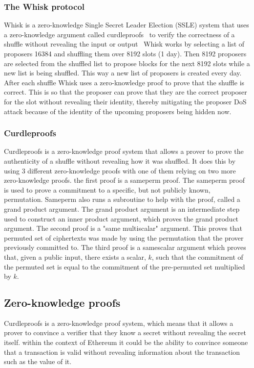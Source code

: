 \subsubsection{The Whisk protocol}\label{sec:background-mitigation}
Whisk is a zero-knowledge Single Secret Leader Election (SSLE) system that uses a zero-knowledge argument called curdleproofs~\cite{Curdleproofs} to verify the correctness of a shuffle without revealing the input or output~\cite{10.1145/3419614.3423258}
Whisk works by selecting a list of proposers 16384 and shuffling them over 8192 slots (1 day).
Then 8192 proposers are selected from the shuffled list to propose blocks for the next 8192 slots while a new list is being shuffled.
This way a new list of proposers is created every day.
After each shuffle Whisk uses a zero-knowledge proof to prove that the shuffle is correct.
This is so that the proposer can prove that they are the correct proposer for the slot without revealing their identity, thereby mitigating the proposer DoS attack because of the identity of the upcoming proposers being hidden now.

\subsubsection{Curdleproofs}\label{sec:background-curdleproofs}
Curdleproofs is a zero-knowledge proof system that allows a prover to prove the authenticity of a shuffle without revealing how it was shuffled.
It does this by using 3 different zero-knowledge proofs with one of them relying on two more zero-knowledge proofs.
the first proof is a sameperm proof.
The sameperm proof is used to prove a commitment to a specific, but not publicly known, permutation.
Sameperm also runs a subroutine to help with the proof, called a grand product argument.
The grand product argument is an intermediate step used to construct an inner product argument, which proves the grand product argument.
The second proof is a "same multiscalar" argument.
This proves that permuted set of ciphertexts was made by using the permutation that the prover previously committed to.
The third proof is a samescalar argument which proves that, given a public input, there exists a scalar, $k$, such that the commitment of the permuted set is equal to the commitment of the pre-permuted set multiplied by $k$.



\subsection{Zero-knowledge proofs}\label{sec:background-zkps}
Curdleproofs is a zero-knowledge proof system, which means that it allows a prover to convince a verifier that they know a secret without revealing the secret itself.
within the context of Ethereum it could be the ability to convince someone that a transaction is valid without revealing information about the transaction such as the value of it.



